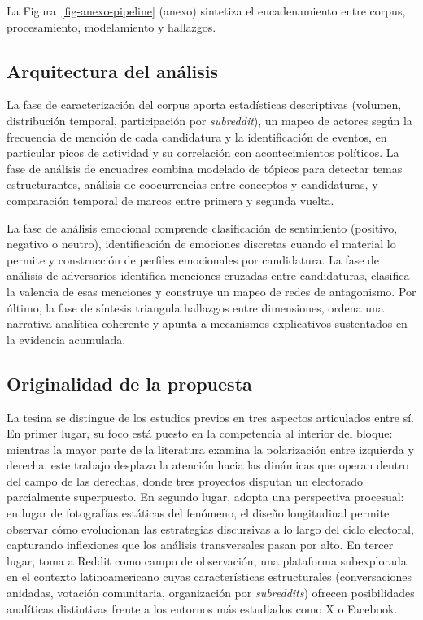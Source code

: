 \documentclass[
  letterpaper,
  numbers=noendperiod,
  fontsize=11pt,
  DIV=12,
  titlepage=false]{scrreprt}
\begin{document}
La Figura~\ref{fig-anexo-pipeline} (anexo) sintetiza el encadenamiento
entre corpus, procesamiento, modelamiento y hallazgos.

\subsection{Arquitectura del
análisis}\label{arquitectura-del-anuxe1lisis}

La fase de caracterización del corpus aporta estadísticas descriptivas
(volumen, distribución temporal, participación por \emph{subreddit}), un
mapeo de actores según la frecuencia de mención de cada candidatura y la
identificación de eventos, en particular picos de actividad y su
correlación con acontecimientos políticos. La fase de análisis de
encuadres combina modelado de tópicos para detectar temas
estructurantes, análisis de coocurrencias entre conceptos y
candidaturas, y comparación temporal de marcos entre primera y segunda
vuelta.

La fase de análisis emocional comprende clasificación de sentimiento
(positivo, negativo o neutro), identificación de emociones discretas
cuando el material lo permite y construcción de perfiles emocionales por
candidatura. La fase de análisis de adversarios identifica menciones
cruzadas entre candidaturas, clasifica la valencia de esas menciones y
construye un mapeo de redes de antagonismo. Por último, la fase de
síntesis triangula hallazgos entre dimensiones, ordena una narrativa
analítica coherente y apunta a mecanismos explicativos sustentados en la
evidencia acumulada.

\subsection{Originalidad de la
propuesta}\label{originalidad-de-la-propuesta}

La tesina se distingue de los estudios previos en tres aspectos
articulados entre sí. En primer lugar, su foco está puesto en la
competencia al interior del bloque: mientras la mayor parte de la
literatura examina la polarización entre izquierda y derecha, este
trabajo desplaza la atención hacia las dinámicas que operan dentro del
campo de las derechas, donde tres proyectos disputan un electorado
parcialmente superpuesto. En segundo lugar, adopta una perspectiva
procesual: en lugar de fotografías estáticas del fenómeno, el diseño
longitudinal permite observar cómo evolucionan las estrategias
discursivas a lo largo del ciclo electoral, capturando inflexiones que
los análisis transversales pasan por alto. En tercer lugar, toma a
Reddit como campo de observación, una plataforma subexplorada en el
contexto latinoamericano cuyas características estructurales
(conversaciones anidadas, votación comunitaria, organización por
\emph{subreddits}) ofrecen posibilidades analíticas distintivas frente a
los entornos más estudiados como X o Facebook.
\end{document}
